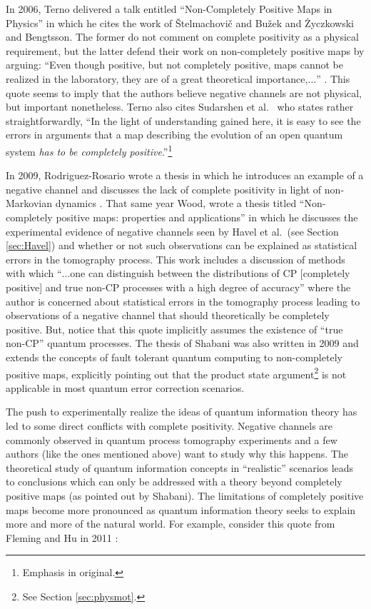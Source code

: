 In 2006, Terno delivered a talk entitled ``Non-Completely Positive Maps in Physics'' \cite{Terno2006} in which he cites the work of \v{S}telmachovi\v{c} and Bu\v{z}ek \cite{Buzek2001} and \.{Z}yczkowski and Bengtsson.  The former do not comment on complete positivity as a physical requirement, but the latter defend their work on non-completely positive maps by arguing: ``Even though positive, but not completely positive, maps cannot be realized in the laboratory, they are of a great theoretical importance,$\ldots$'' \cite{Zyczkowski2004}.  This quote seems to imply that the authors believe negative channels are not physical, but important nonetheless.  Terno also cites Sudarshen et al.\ \cite{Jordan2004} who states rather straightforwardly, ``In the light of understanding gained here, it is easy to see the errors in arguments that a map describing the evolution of an open quantum system {\em has to be completely positive}.''\footnote{Emphasis in original.}  

In 2009, Rodriguez-Rosario wrote a thesis in which he introduces an example of a negative channel and discusses the lack of complete positivity in light of non-Markovian dynamics \cite{Rodriguez2008}.  That same year Wood, wrote a thesis titled ``Non-completely positive maps: properties and applications'' \cite{Wood2009} in which he discusses the experimental evidence of negative channels seen by Havel et al.\ (see Section \ref{sec:Havel}) and whether or not such observations can be explained as statistical errors in the tomography process.  This work includes a discussion of methods with which ``$\ldots$one can distinguish between the distributions of CP [completely positive] and true non-CP processes with a high degree of accuracy'' where the author is concerned about statistical errors in the tomography process leading to observations of a negative channel that should theoretically be completely positive.  But, notice that this quote implicitly assumes the existence of ``true non-CP'' quantum processes.  The thesis of Shabani \cite{Shabani2009} was also written in 2009 and extends the concepts of fault tolerant quantum computing to non-completely positive maps, explicitly pointing out that the product state argument\footnote{See Section \ref{sec:physmot}.} is not applicable in most quantum error correction scenarios.  

The push to experimentally realize the ideas of quantum information theory has led to some direct conflicts with complete positivity.  Negative channels are commonly observed in quantum process tomography experiments and a few authors (like the ones mentioned above) want to study why this happens.  The theoretical study of quantum information concepts in ``realistic'' scenarios leads to conclusions which can only be addressed with a theory beyond completely positive maps (as pointed out by Shabani).  The limitations of completely positive maps become more pronounced as quantum information theory seeks to explain more and more of the natural world.  For example, consider this quote from Fleming and Hu in 2011 \cite{Fleming2012}:

